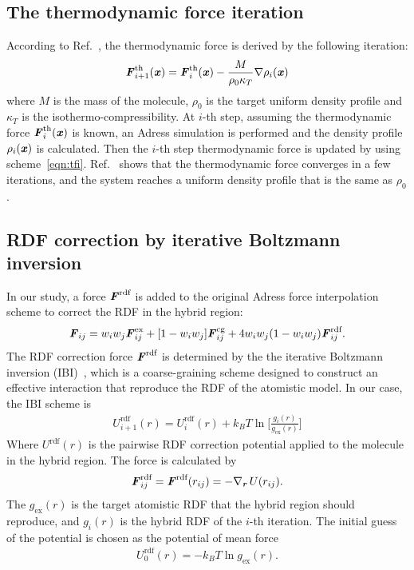 \documentclass[aps,pre,preprint,unsortedaddress]{revtex4}
\renewcommand{\v}[1]{\textbf{\textit{#1}}}
\begin{document}
\subsection{The thermodynamic force iteration }

According to Ref.~\cite{fritsch2011grand}, the thermodynamic force is derived
by the following iteration:
\begin{align}\label{eqn:tfi}
  \v F^{\textrm{th}}_{i+1}(\v x) = \v F^{\textrm{th}}_i(\v x)
  - \frac{M}{\rho_0\kappa_T}\nabla\rho_i(\v x)
\end{align}
where $M$ is the mass of the molecule, $\rho_0$ is the
target uniform density profile and $\kappa_T$ is the
isothermo-compressibility. At $i$-th step, assuming the thermodynamic
force $\v F^{\textrm{th}}_i(\v x)$ is known, an Adress simulation is
performed and the density profile $\rho_i(\v x)$ is calculated. Then
the $i$-th step thermodynamic force is updated by using
scheme~\eqref{eqn:tfi}.  Ref.~\cite{fritsch2011grand} shows that the
thermodynamic force converges in a few iterations, and the system
reaches a uniform density profile that is the same as $\rho_0$.

\subsection{RDF correction by iterative Boltzmann inversion}

In our study, a force $\v F^{\textrm{rdf}}$ is added to the
original Adress force interpolation scheme to correct the RDF in
the hybrid region:
\begin{align}
  \v F_{ij} = w_iw_j\v F^{\textrm{ex}}_{ij} + [1-w_iw_j]\v F^{\textrm{cg}}_{ij} +
  4 w_iw_j (1 - w_iw_j)\v F_{ij}^{\textrm{rdf}}.
\end{align}
The RDF correction force $\v F^{\textrm{rdf}}$ is determined by the the
iterative Boltzmann inversion (IBI)~\cite{mueller2002coarse,
  reith2003deriving}, which is a coarse-graining scheme designed to
construct an effective interaction that reproduce the RDF of the
atomistic model. In our case, the IBI scheme is 
\begin{align}\label{eqn:ibi}
  U^{\textrm{rdf}}_{i+1}(r) = U^{\textrm{rdf}}_i(r) +
  k_B T\ln\bigg[
  \frac{g_i(r)}{g_{\textrm{ex}}(r)}
  \bigg]
\end{align}
Where $U^{\textrm{rdf}}(r)$ is the pairwise RDF correction potential
applied to the molecule in the hybrid region. The force is
calculated by
\begin{align}
  \v F^{\textrm{rdf}}_{ij} = \v F^{\textrm{rdf}}(r_{ij})
  = -\nabla_{\v r}\,U(r_{ij}).
\end{align}
The $g_{\textrm{ex}}(r)$ is the target atomistic RDF that the hybrid
region should reproduce, and $g_i(r)$ is the hybrid RDF of the $i$-th
iteration.  The initial guess of the potential is chosen as the
potential of mean force
\begin{align}\label{eqn:pmf}
  U^{\textrm{rdf}}_0(r) = -k_BT \ln g_{\textrm{ex}}(r).
\end{align}
\end{document}
